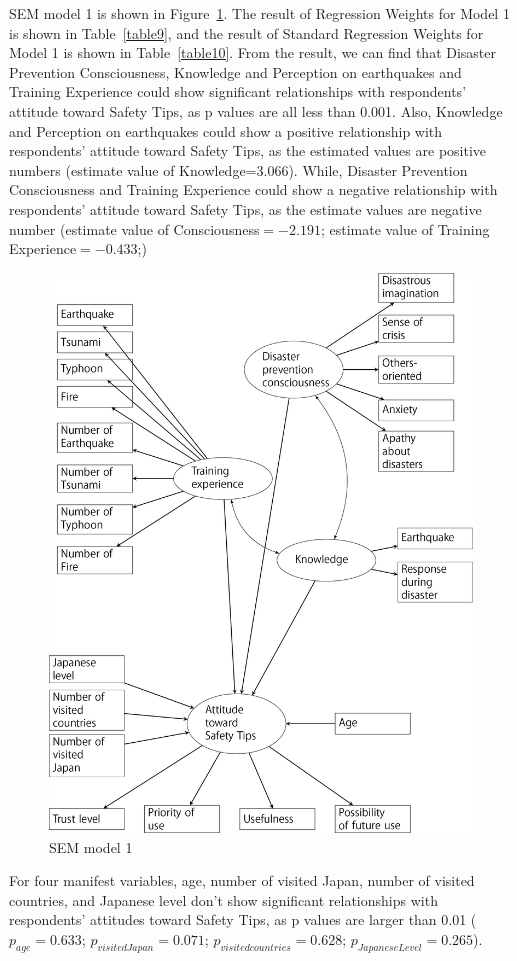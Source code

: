 SEM model 1 is shown in Figure~\ref{fig23}. The result of Regression Weights for Model 1 is shown in Table~\ref{table9}, and the result of Standard Regression Weights for Model 1 is shown in Table~\ref{table10}. From the result, we can find that Disaster Prevention Consciousness, Knowledge and Perception on earthquakes and Training Experience could show significant relationships with respondents' attitude toward Safety Tips, as p values are all less than 0.001. Also, Knowledge and Perception on earthquakes could show a positive relationship with respondents' attitude toward Safety Tips, as the estimated values are positive numbers (estimate value of Knowledge=3.066). While, Disaster Prevention Consciousness and Training Experience could show a negative relationship with respondents' attitude toward Safety Tips, as the estimate values are negative number (estimate value of Consciousness$=-2.191$; estimate value of Training Experience$=-0.433$;) 

\begin{figure}[h]
  \includegraphics[width=0.5\linewidth]{Figure/Figure23.png}
  \centering
  \caption{SEM model 1}
  \label{fig23}
\end{figure}

For four manifest variables, age, number of visited Japan, number of visited countries, and Japanese level don't show significant relationships with respondents' attitudes toward Safety Tips, as p values are larger than 0.01 ($p_{age} =0.633$; $p_{visitedJapan} =0.071$; $p_{visitedcountries} =0.628$; $p_{JapaneseLevel} =0.265$). 

